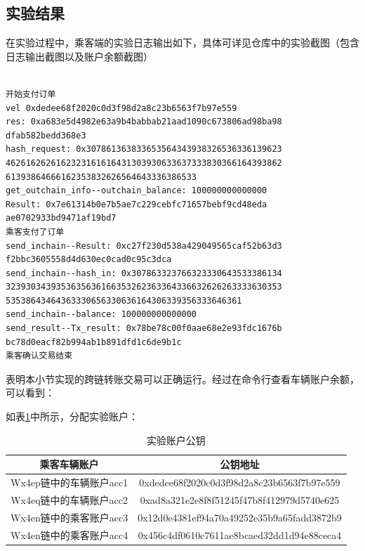 \subsection{实验结果}

在实验过程中，乘客端的实验日志输出如下，具体可详见仓库中的实验截图（包含日志输出截图以及账户余额截图）

\begin{verbatim}

开始支付订单
vel 0xdedee68f2020c0d3f98d2a8c23b6563f7b97e559
res: 0xa683e5d4982e63a9b4babbab21aad1090c673806ad98ba98
dfab582bedd368e3
hash_request: 0x307861363833653564343938326536336139623
4626162626162323161616431303930633637333830366164393862
61393864666162353832626564643336386533
get_outchain_info--outchain_balance: 100000000000000
Result: 0x7e61314b0e7b5ae7c229cebfc71657bebf9cd48eda
ae0702933bd9471af19bd7
乘客支付了订单
send_inchain--Result: 0xc27f230d538a429049565caf52b63d3
f2bbc3605558d4d630ec0cad0c95c3dca
send_inchain--hash_in: 0x307863323766323330643533386134
3239303439353635636166353262363364336632626263333630353
53538643464363330656330636164306339356333646361
send_inchain--balance: 100000000000000
send_result--Tx_result: 0x78be78c00f0aae68e2e93fdc1676b
bc78d0eacf82b994ab1b891dfd1c6de9b1c
乘客确认交易结束

\end{verbatim}

表明本小节实现的跨链转账交易可以正确运行。经过在命令行查看车辆账户余额，可以看到：

如表\ref{实验账户公钥}中所示，分配实验账户：

\begin{table}
    \linespread{1.5}
    \centering
    \caption{实验账户公钥}\label{实验账户公钥}
    \begin{tabular}{cc} \toprule
        乘客车辆账户                  & 公钥地址                         \\ \hline
        Wx4ep链中的车辆账户acc1 & 0xdedee68f2020c0d3f98d2a8c23b6563f7b97e559            \\
        Wx4eq链中的车辆账户acc2   & 0xad8a321e2e8f8f51245f47b8f412979d5740e625            \\
        Wx4en链中的乘客账户acc3   & 0x12d0e4381ef94a70a49252e35b9a65fadd3872b9 
        \\
        Wx4en链中的乘客账户acc4   & 0x456c4df0610c7611ae8bcaed32dd1d94e88ceca4
        \\\bottomrule
    \end{tabular}
\end{table}

